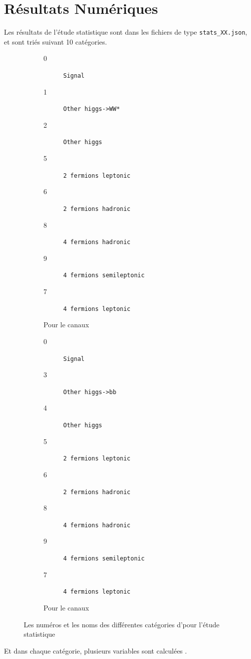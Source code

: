 \section{Résultats Numériques}

Les résultats de l'étude statistique sont dans les fichiers de type \verb|stats_XX.json|, et sont triés suivant 10 catégories. 

\begin{figure}[!ht]
	\centering
	\begin{subfigure}[b]{0.45\textwidth}
		\begin{description}
			\item[0] \verb|Signal|
			\item[1] \verb|Other higgs->WW*|
			\item[2] \verb|Other higgs|
			\item[5] \verb|2 fermions leptonic|
			\item[6] \verb|2 fermions hadronic|
			\item[8] \verb|4 fermions hadronic|
			\item[9] \verb|4 fermions semileptonic|
			\item[7] \verb|4 fermions leptonic|
		\end{description}
		\label{stats:results:WW}
		\caption{Pour le canaux \WW}
	\end{subfigure}
     \hfill
	\begin{subfigure}[b]{0.45\textwidth}
		\begin{description}
			\item[0] \verb|Signal|
			\item[3] \verb|Other higgs->bb|
			\item[4] \verb|Other higgs|
			\item[5] \verb|2 fermions leptonic|
			\item[6] \verb|2 fermions hadronic|
			\item[8] \verb|4 fermions hadronic|
			\item[9] \verb|4 fermions semileptonic|
			\item[7] \verb|4 fermions leptonic|
		\end{description}
		\caption{Pour le canaux \bb}
		\label{stats:results:bb}
	\end{subfigure}
	\label{stats:results}
	\caption{Les numéros et les noms des différentes catégories d'\analysis pour l'étude statistique}
\end{figure}

Et dans chaque catégorie, plusieurs variables sont calculées \Figure{\ref{stats:results:vrb}}.

